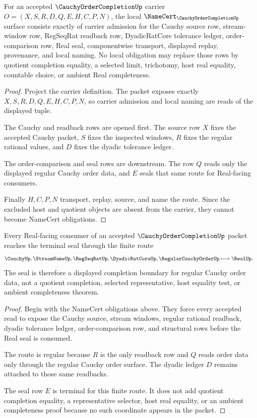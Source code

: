 \begin{theorem}
\label{thm:cauchy-order-completion-namecert-obligations}
For an accepted $\CauchyOrderCompletionUp$ carrier $O=(X,S,R,D,Q,E,H,C,P,N)$, the local $\NameCert_{\CauchyOrderCompletionUp}$ surface consists exactly of carrier admission for the Cauchy source row, stream-window row, RegSeqRat readback row, DyadicRatCore tolerance ledger, order-comparison row, Real seal, componentwise transport, displayed replay, provenance, and local naming. No local obligation may replace those rows by quotient completion equality, a selected limit, trichotomy, host real equality, countable choice, or ambient Real completeness.
\end{theorem}
\begin{proof}
Project the carrier definition. The packet exposes exactly $X,S,R,D,Q,E,H,C,P,N$, so carrier admission and local naming are reads of the displayed tuple.

The Cauchy and readback rows are opened first. The source row $X$ fixes the accepted Cauchy packet, $S$ fixes the inspected windows, $R$ fixes the regular rational values, and $D$ fixes the dyadic tolerance ledger.

The order-comparison and seal rows are downstream. The row $Q$ reads only the displayed regular Cauchy order data, and $E$ seals that same route for Real-facing consumers.

Finally $H,C,P,N$ transport, replay, source, and name the route. Since the excluded host and quotient objects are absent from the carrier, they cannot become NameCert obligations.
\end{proof}

\begin{theorem}
\label{thm:cauchy-order-completion-regular-seal-route}
Every Real-facing consumer of an accepted $\CauchyOrderCompletionUp$ packet reaches the terminal seal through the finite route
$$
\CauchyUp,\StreamNameUp,\RegSeqRatUp,\DyadicRatCoreUp,\RegularCauchyOrderUp \longmapsto \RealUp .
$$
The seal is therefore a displayed completion boundary for regular Cauchy order data, not a quotient completion, selected representative, host equality test, or ambient completeness theorem.
\end{theorem}
\begin{proof}
Begin with the NameCert obligations above. They force every accepted read to expose the Cauchy source, stream windows, regular rational readback, dyadic tolerance ledger, order-comparison row, and structural rows before the Real seal is consumed.

The route is regular because $R$ is the only readback row and $Q$ reads order data only through the regular Cauchy order surface. The dyadic ledger $D$ remains attached to those same readbacks.

The seal row $E$ is terminal for this finite route. It does not add quotient completion equality, a representative selector, host real equality, or an ambient completeness proof because no such coordinate appears in the packet.
\end{proof}

